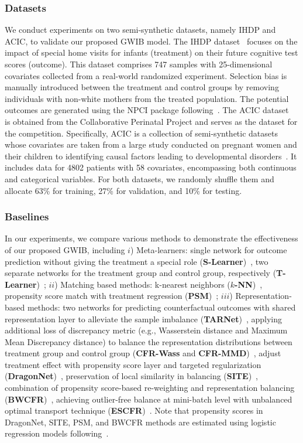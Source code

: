 \documentclass{article}
\begin{document}
\subsubsection{Datasets}
We conduct experiments on two semi-synthetic datasets, namely IHDP and ACIC, to validate our proposed GWIB model.
The IHDP dataset~\cite{hill2011bayesian} focuses on the impact of special home visits for infants (treatment) on their future cognitive test scores (outcome). 
This dataset comprises 747 samples with 25-dimensional covariates collected from a real-world randomized experiment. 
Selection bias is manually introduced between the treatment and control groups by removing individuals with non-white mothers from the treated population.
The potential outcomes are generated using the NPCI package following~\cite{yao2018representation}.
The ACIC dataset~\cite{dorie2019automated} is obtained from the Collaborative Perinatal Project and serves as the dataset for the competition. 
Specifically, ACIC is a collection of semi-synthetic datasets whose covariates are taken from a large study conducted on pregnant women and their children to identifying causal factors leading to developmental disorders~\cite{niswander1972women}.
It includes data for 4802 patients with 58 covariates, encompassing both continuous and categorical variables.
For both datasets, we randomly shuffle them and allocate 63\% for training, 27\% for validation, and 10\% for testing.
\subsubsection{Baselines}
In our experiments, we compare various methods to demonstrate the effectiveness of our proposed GWIB, including 
$i$) Meta-learners: single network for outcome prediction without giving the treatment a special role (\textbf{S-Learner})~\cite{kunzel2019metalearners}, two separate networks for the treatment group and control group, respectively (\textbf{T-Learner})~\cite{kunzel2019metalearners};
$ii$) Matching based methods: k-nearest neighbors (\textbf{$k$-NN})~\cite{crump2008nonparametric}, propensity score match with treatment regression (\textbf{PSM})~\cite{caliendo2008some};
$iii$) Representation-based methods: two networks for predicting counterfactual outcomes with shared representation layer to alleviate the sample imbalance (\textbf{TARNet})~\cite{shalit2017estimating}, applying additional loss of discrepancy metric (e.g., Wasserstein distance and Maximum Mean Discrepancy distance) to balance the representation distributions between treatment group and control group (\textbf{CFR-Wass} and \textbf{CFR-MMD})~\cite{shalit2017estimating}, adjust treatment effect with propensity score layer and targeted regularization (\textbf{DragonNet})~\cite{shi2019adapting}, preservation of local similarity in balancing (\textbf{SITE})~\cite{yao2018representation}, combination of propensity score-based re-weighting and representation balancing (\textbf{BWCFR})~\cite{assaad2021counterfactual}, achieving outlier-free balance at mini-batch level with unbalanced optimal transport technique (\textbf{ESCFR})~\cite{wang2023optimal}.
Note that propensity scores in DragonNet, SITE, PSM, and BWCFR methods are estimated using logistic regression models following~\cite{caliendo2008some}.
\end{document}
